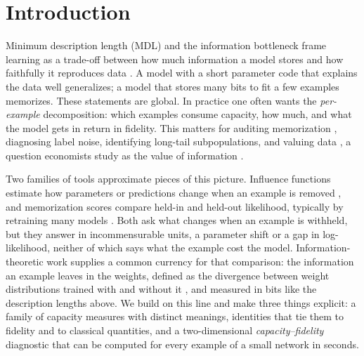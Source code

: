 \documentclass[10pt,twocolumn,letterpaper]{article}
\theoremstyle{definition}
\begin{document}
\section{Introduction}
Minimum description length (MDL) and the information bottleneck frame learning as a trade-off between how much information a model stores and how faithfully it reproduces data \citep{rissanen1978,hinton1993,tishby2000,grunwald2007}. A model with a short parameter code that explains the data well generalizes; a model that stores many bits to fit a few examples memorizes. These statements are global. In practice one often wants the \emph{per-example} decomposition: which examples consume capacity, how much, and what the model gets in return in fidelity. This matters for auditing memorization \citep{zhang2017,feldman2020,feldman2020neural}, diagnosing label noise, identifying long-tail subpopulations, and valuing data \citep{ghorbani2019,pruthi2020,covert2024}, a question economists study as the value of information \citep{raiffa1961,abadie2023}.

Two families of tools approximate pieces of this picture. Influence functions estimate how parameters or predictions change when an example is removed \citep{cook1977,koh2017}, and memorization scores compare held-in and held-out likelihood, typically by retraining many models \citep{feldman2020neural}. Both ask what changes when an example is withheld, but they answer in incommensurable units, a parameter shift or a gap in log-likelihood, neither of which says what the example cost the model. Information-theoretic work supplies a common currency for that comparison: the information an example leaves in the weights, defined as the divergence between weight distributions trained with and without it \citep{achille2019,harutyunyan2021}, and measured in bits like the description lengths above. We build on this line and make three things explicit: a family of capacity measures with distinct meanings, identities that tie them to fidelity and to classical quantities, and a two-dimensional \emph{capacity--fidelity} diagnostic that can be computed for every example of a small network in seconds.
\end{document}
